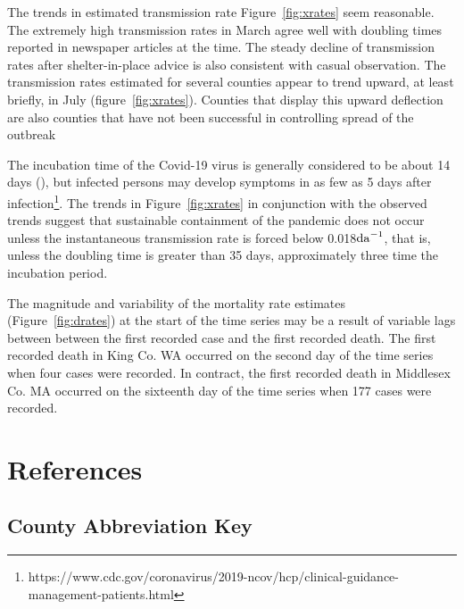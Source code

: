 \documentclass[12pt,letterpaper]{article}
\newcommand\perda{$\rm{da}^{-1}$}
\begin{document}
{The trends in estimated transmission rate Figure~\ref{fig:xrates} seem
reasonable. The extremely high transmission rates in March agree well
with doubling times reported in newspaper articles at the time.
The steady decline of transmission rates after shelter-in-place advice is 
also consistent with casual observation.
The transmission rates estimated for several counties appear to trend
upward, at least briefly, in July (figure~\ref{fig:xrates}). Counties
that display this upward deflection are also counties that have not
been successful in controlling spread of the outbreak


The incubation time of the Covid-19 virus is generally considered to be
about 14 days (\cite{Someone2020}), but infected persons may develop
symptoms in as few as 5 days after
infection\footnote{https://www.cdc.gov/coronavirus/2019-ncov/hcp/clinical-guidance-management-patients.html}.
The trends in Figure~\ref{fig:xrates} in conjunction with the
observed trends suggest that sustainable containment of
the pandemic does not occur unless the instantaneous transmission rate
is forced below  0.018\perda, that is, unless the doubling
time is greater than 35 days, approximately three time the incubation
period.

The magnitude and variability of the mortality rate estimates
(Figure~\ref{fig:drates})
at the start of the time series may be a result of variable lags
between between the first recorded case and the first recorded death.
The first recorded death in King Co. WA occurred on the second day of
the time series when four cases were recorded.
In contract, the first recorded death in Middlesex Co. MA occurred on
the sixteenth day of the time series when 177 cases were recorded.



\clearpage
\section*{References}
\printbibliography[heading=none]
\clearpage

\appendixpage
\begin{appendices}


\section{County Abbreviation Key}


\end{appendices}}
\end{document}
